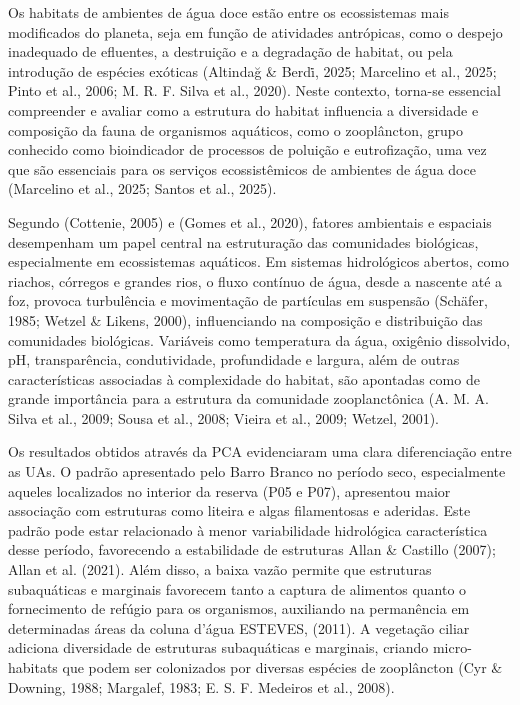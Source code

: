 \documentclass[
  letterpaper,
  DIV=11,
  numbers=noendperiod]{scrartcl}
\begin{document}
Os habitats de ambientes de água doce estão entre os ecossistemas mais
modificados do planeta, seja em função de atividades antrópicas, como o
despejo inadequado de efluentes, a destruição e a degradação de habitat,
ou pela introdução de espécies exóticas (Altindağ \& Berdi̇, 2025;
Marcelino et al., 2025; Pinto et al., 2006; M. R. F. Silva et al.,
2020). Neste contexto, torna-se essencial compreender e avaliar como a
estrutura do habitat influencia a diversidade e composição da fauna de
organismos aquáticos, como o zooplâncton, grupo conhecido como
bioindicador de processos de poluição e eutrofização, uma vez que são
essenciais para os serviços ecossistêmicos de ambientes de água doce
(Marcelino et al., 2025; Santos et al., 2025).

Segundo (Cottenie, 2005) e (Gomes et al., 2020), fatores ambientais e
espaciais desempenham um papel central na estruturação das comunidades
biológicas, especialmente em ecossistemas aquáticos. Em sistemas
hidrológicos abertos, como riachos, córregos e grandes rios, o fluxo
contínuo de água, desde a nascente até a foz, provoca turbulência e
movimentação de partículas em suspensão (Schäfer, 1985; Wetzel \&
Likens, 2000), influenciando na composição e distribuição das
comunidades biológicas. Variáveis como temperatura da água, oxigênio
dissolvido, pH, transparência, condutividade, profundidade e largura,
além de outras características associadas à complexidade do habitat, são
apontadas como de grande importância para a estrutura da comunidade
zooplanctônica (A. M. A. Silva et al., 2009; Sousa et al., 2008; Vieira
et al., 2009; Wetzel, 2001).

Os resultados obtidos através da PCA evidenciaram uma clara
diferenciação entre as UAs. O padrão apresentado pelo Barro Branco no
período seco, especialmente aqueles localizados no interior da reserva
(P05 e P07), apresentou maior associação com estruturas como liteira e
algas filamentosas e aderidas. Este padrão pode estar relacionado à
menor variabilidade hidrológica característica desse período,
favorecendo a estabilidade de estruturas Allan \& Castillo (2007); Allan
et al. (2021). Além disso, a baixa vazão permite que estruturas
subaquáticas e marginais favorecem tanto a captura de alimentos quanto o
fornecimento de refúgio para os organismos, auxiliando na permanência em
determinadas áreas da coluna d'água ESTEVES, (2011). A vegetação ciliar
adiciona diversidade de estruturas subaquáticas e marginais, criando
micro-habitats que podem ser colonizados por diversas espécies de
zooplâncton (Cyr \& Downing, 1988; Margalef, 1983; E. S. F. Medeiros et
al., 2008).
\end{document}
